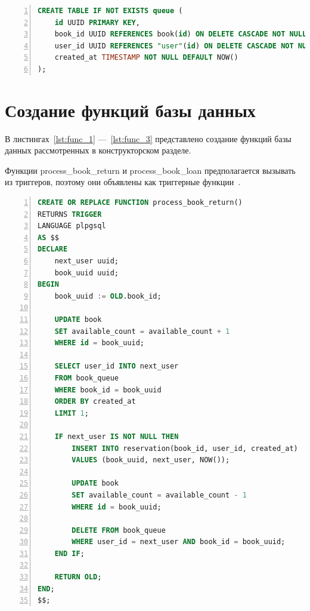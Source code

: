 \begin{center}
	\captionsetup{justification=raggedright,singlelinecheck=off}
	\begin{lstlisting}[language=sql, frame=single, numbers=left, label=lst:queue, caption=Создание таблицы queue]
CREATE TABLE IF NOT EXISTS queue (
	id UUID PRIMARY KEY,
	book_id UUID REFERENCES book(id) ON DELETE CASCADE NOT NULL,
	user_id UUID REFERENCES "user"(id) ON DELETE CASCADE NOT NULL,
	created_at TIMESTAMP NOT NULL DEFAULT NOW()
);
	\end{lstlisting}
\end{center}

\section{Создание функций базы данных}
В листингах~\ref{lst:func_1} ---~\ref{lst:func_3} представлено создание функций базы данных рассмотренных в конструкторском разделе.

Функции process\_book\_return и process\_book\_loan предполагается вызывать из триггеров, поэтому они объявлены как триггерные функции~\cite{триггерная_функция}.

\begin{center}
	\captionsetup{justification=raggedright,singlelinecheck=off}
	\begin{lstlisting}[language=sql, frame=single, numbers=left, label=lst:func_1, caption=Создание функции process\_book\_return]
CREATE OR REPLACE FUNCTION process_book_return()
RETURNS TRIGGER 
LANGUAGE plpgsql
AS $$
DECLARE
	next_user uuid;
	book_uuid uuid;
BEGIN
	book_uuid := OLD.book_id;
	
	UPDATE book
	SET available_count = available_count + 1
	WHERE id = book_uuid;
	
	SELECT user_id INTO next_user
	FROM book_queue
	WHERE book_id = book_uuid
	ORDER BY created_at
	LIMIT 1;
	
	IF next_user IS NOT NULL THEN
		INSERT INTO reservation(book_id, user_id, created_at)
		VALUES (book_uuid, next_user, NOW());
		
		UPDATE book
		SET available_count = available_count - 1
		WHERE id = book_uuid;
		
		DELETE FROM book_queue
		WHERE user_id = next_user AND book_id = book_uuid;
	END IF;
	
	RETURN OLD;
END;
$$;

	\end{lstlisting}
\end{center}

